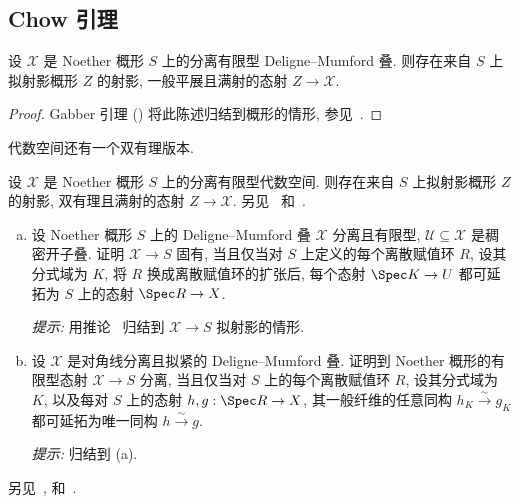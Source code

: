 \subsection{Chow 引理}\label{src:5.6.2-subsection}
\begin{corollary}\label{src:5.6.5}
设 $\mathcal X$ 是 Noether 概形 $S$ 上的分离有限型 Deligne--Mumford 叠. 则存在来自 $S$ 上拟射影概形 $Z$ 的射影, 一般平展且满射的态射 $Z\to\mathcal X$.
\end{corollary}
\begin{proof}
Gabber 引理 () 将此陈述归结到概形的情形, 参见~\cite[习题 II.4.10]{Har77}.
\end{proof}
代数空间还有一个双有理版本.
\begin{exercise}\label{src:5.6.6}
设 $\mathcal X$ 是 Noether 概形 $S$ 上的分离有限型代数空间. 则存在来自 $S$ 上拟射影概形 $Z$ 的射影, 双有理且满射的态射 $Z\to\mathcal X$. 另见~\cite[IV.3.1]{Knu71} 和~\cite[Tag 088U]{SP}.
\end{exercise}
\begin{exercise}[赋值判据可在稠密开集上检验]\label{src:5.6.7}
\begin{enumerate}[(a)]
\item 设 Noether 概形 $S$ 上的 Deligne--Mumford 叠 $\mathcal X$ 分离且有限型, $\mathcal U\subseteq\mathcal X$ 是稠密开子叠. 证明 $\mathcal X\to S$ 固有, 当且仅当对 $S$ 上定义的每个离散赋值环 $R$, 设其分式域为 $K$, 将 $R$ 换成离散赋值环的扩张后, 每个态射 $\Spec K\to\mathcal U$ 都可延拓为 $S$ 上的态射 $\Spec R\to\mathcal X$.

\textit{提示:} 用推论~ 归结到 $\mathcal X\to S$ 拟射影的情形.
\item 设 $\mathcal X$ 是对角线分离且拟紧的 Deligne--Mumford 叠. 证明到 Noether 概形的有限型态射 $\mathcal X\to S$ 分离, 当且仅当对 $S$ 上的每个离散赋值环 $R$, 设其分式域为 $K$, 以及每对 $S$ 上的态射 $h,g:\Spec R\to\mathcal X$, 其一般纤维的任意同构 $h_K\xrightarrow{\sim}g_K$ 都可延拓为唯一同构 $h\xrightarrow{\sim}g$.

\textit{提示:} 归结到 (a).
\end{enumerate}
另见~\cite[II.7.3.10]{EGA}, \cite{MO09} 和~\cite[Tag 089G]{SP}.
\end{exercise}

